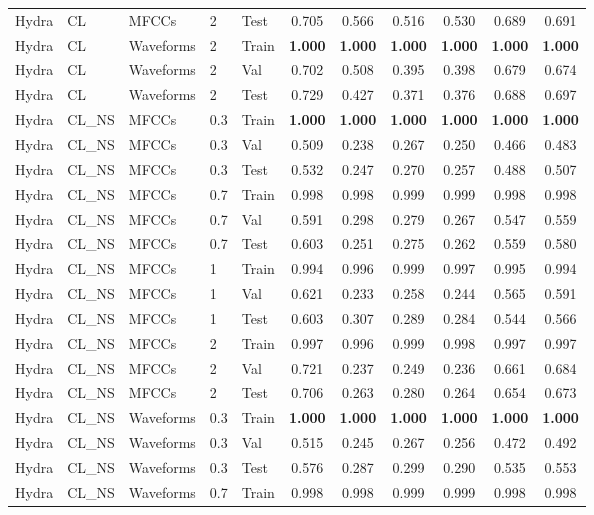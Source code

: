 \begin{landscape}
\begin{longtable}{|l|l|l|l|l|c|c|c|c|c|c|}
Hydra & CL & MFCCs & 2 & Test & 0.705 & 0.566 & 0.516 & 0.530 & 0.689 & 0.691 \\
Hydra & CL & Waveforms & 2 & Train & \textbf{1.000} & \textbf{1.000} & \textbf{1.000} & \textbf{1.000} & \textbf{1.000} & \textbf{1.000} \\
Hydra & CL & Waveforms & 2 & Val & 0.702 & 0.508 & 0.395 & 0.398 & 0.679 & 0.674 \\
Hydra & CL & Waveforms & 2 & Test & 0.729 & 0.427 & 0.371 & 0.376 & 0.688 & 0.697 \\
Hydra & CL\_NS & MFCCs & 0.3 & Train & \textbf{1.000} & \textbf{1.000} & \textbf{1.000} & \textbf{1.000} & \textbf{1.000} & \textbf{1.000} \\
Hydra & CL\_NS & MFCCs & 0.3 & Val & 0.509 & 0.238 & 0.267 & 0.250 & 0.466 & 0.483 \\
Hydra & CL\_NS & MFCCs & 0.3 & Test & 0.532 & 0.247 & 0.270 & 0.257 & 0.488 & 0.507 \\
Hydra & CL\_NS & MFCCs & 0.7 & Train & 0.998 & 0.998 & 0.999 & 0.999 & 0.998 & 0.998 \\
Hydra & CL\_NS & MFCCs & 0.7 & Val & 0.591 & 0.298 & 0.279 & 0.267 & 0.547 & 0.559 \\
Hydra & CL\_NS & MFCCs & 0.7 & Test & 0.603 & 0.251 & 0.275 & 0.262 & 0.559 & 0.580 \\
Hydra & CL\_NS & MFCCs & 1 & Train & 0.994 & 0.996 & 0.999 & 0.997 & 0.995 & 0.994 \\
Hydra & CL\_NS & MFCCs & 1 & Val & 0.621 & 0.233 & 0.258 & 0.244 & 0.565 & 0.591 \\
Hydra & CL\_NS & MFCCs & 1 & Test & 0.603 & 0.307 & 0.289 & 0.284 & 0.544 & 0.566 \\
Hydra & CL\_NS & MFCCs & 2 & Train & 0.997 & 0.996 & 0.999 & 0.998 & 0.997 & 0.997 \\
Hydra & CL\_NS & MFCCs & 2 & Val & 0.721 & 0.237 & 0.249 & 0.236 & 0.661 & 0.684 \\
Hydra & CL\_NS & MFCCs & 2 & Test & 0.706 & 0.263 & 0.280 & 0.264 & 0.654 & 0.673 \\
Hydra & CL\_NS & Waveforms & 0.3 & Train & \textbf{1.000} & \textbf{1.000} & \textbf{1.000} & \textbf{1.000} & \textbf{1.000} & \textbf{1.000} \\
Hydra & CL\_NS & Waveforms & 0.3 & Val & 0.515 & 0.245 & 0.267 & 0.256 & 0.472 & 0.492 \\
Hydra & CL\_NS & Waveforms & 0.3 & Test & 0.576 & 0.287 & 0.299 & 0.290 & 0.535 & 0.553 \\
Hydra & CL\_NS & Waveforms & 0.7 & Train & 0.998 & 0.998 & 0.999 & 0.999 & 0.998 & 0.998 \\

\end{longtable}
\end{landscape}
